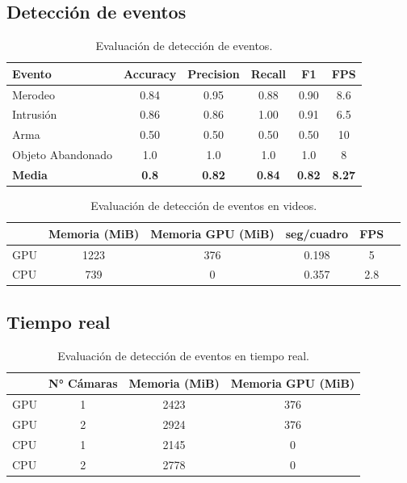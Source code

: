 \documentclass[11pt,a4paper]{article}
\begin{document}
\subsection{Detección de eventos}

\begin{table}
    \centering
    \begin{tabular}{lccccc}
        \toprule
        Evento            & Accuracy     & Precision     & Recall        & F1            & FPS           \\
        \midrule
        Merodeo           & 0.84         & 0.95          & 0.88          & 0.90          & 8.6           \\
        Intrusión         & 0.86         & 0.86          & 1.00          & 0.91          & 6.5           \\
        Arma              & 0.50         & 0.50          & 0.50          & 0.50          & 10            \\
        Objeto Abandonado & 1.0          & 1.0           & 1.0           & 1.0           & 8             \\
        \textbf{Media}    & \textbf{0.8} & \textbf{0.82} & \textbf{0.84} & \textbf{0.82} & \textbf{8.27} \\
        \bottomrule
    \end{tabular}
    \caption{Evaluación de detección de eventos.}
\end{table}

\begin{table}
    \centering
    \begin{tabular}{lccccc}
        \toprule
            & Memoria (MiB) & Memoria GPU (MiB) & seg/cuadro & FPS \\
        \midrule
        GPU & 1223          & 376               & 0.198      & 5   \\
        CPU & 739           & 0                 & 0.357      & 2.8 \\
        \bottomrule
    \end{tabular}
    \caption{Evaluación de detección de eventos en videos.}
\end{table}

\subsection{Tiempo real}


\begin{table}
    \centering
    \begin{tabular}{lccc}
        \toprule
            & N° Cámaras & Memoria (MiB) & Memoria GPU (MiB) \\
        \midrule
        GPU & 1          & 2423          & 376               \\
        GPU & 2          & 2924          & 376               \\
        CPU & 1          & 2145          & 0                 \\
        CPU & 2          & 2778          & 0                 \\
        \bottomrule
    \end{tabular}
    \caption{Evaluación de detección de eventos en tiempo real.}
\end{table}
\end{document}
